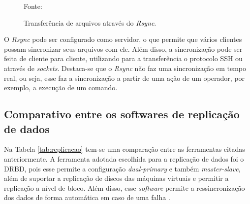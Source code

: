 \begin{figure}[h!]
 \centering
 \caption{Transferência de arquivos através do \textit{Rsync}.}
 Fonte: \citet{lopez2012}
 \label{fig:rsync}
\end{figure}


O \textit{Rsync} pode ser configurado como servidor, o que permite que vários clientes possam sincronizar seus arquivos com ele. 
Além disso, a sincronização pode ser feita de cliente para cliente, utilizando para a transferência o protocolo \ac{SSH} ou através de 
\textit{sockets}. Destaca-se que o \textit{Rsync} não faz uma sincronização em tempo real, ou seja, esse faz a sincronização a partir de 
uma ação de um operador, por exemplo, a execução de um comando.


\newpage
\subsection{Comparativo entre os softwares de replicação de dados}
\label{section:replicacaoescolhido}

Na Tabela \ref{tab:replicacao} tem-se uma comparação entre as ferramentas citadas anteriormente. A ferramenta adotada escolhida para a replicação 
de dados foi o \ac{DRBD}, pois esse permite a configuração \textit{dual-primary} e também \textit{master-slave}, além de suportar a replicação 
de discos das máquinas virtuais e permitir a replicação a nível de bloco. Além disso, esse \textit{software} permite a ressincronização dos dados 
de forma automática em caso de uma falha \cite{drbd}.

